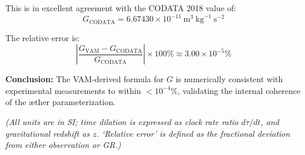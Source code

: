This is in excellent agreement with the CODATA 2018 value of:
\[
G_\text{CODATA} = 6.67430 \times 10^{-11} \ \text{m}^3 \ \text{kg}^{-1} \ \text{s}^{-2}
\]

The relative error is:
\[
\left| \frac{G_\text{VAM} - G_\text{CODATA}}{G_\text{CODATA}} \right| \times 100\% \approx 3.00 \times 10^{-5}\%
\]

\noindent
\textbf{Conclusion:} The VAM-derived formula for \( G \) is numerically consistent with experimental measurements to within \( < 10^{-4}\% \), validating the internal coherence of the æther parameterization.

\textit{(All units are in SI; time dilation is expressed as clock rate ratio $d\tau/dt$, and gravitational redshift as $z$. ‘Relative error' is defined as the fractional deviation from either observation or GR.)}